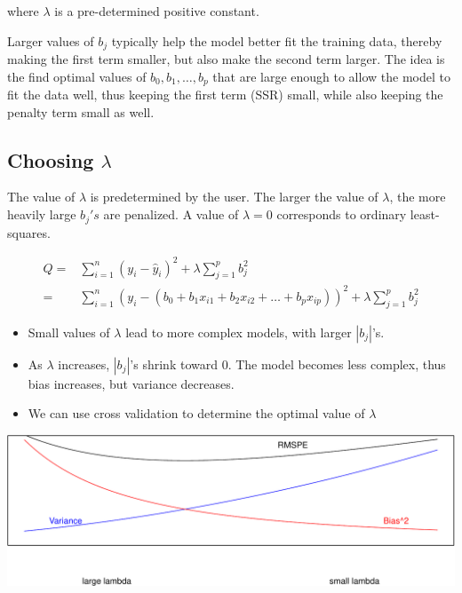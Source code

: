 \documentclass[
  letterpaper,
  DIV=11,
  numbers=noendperiod]{scrreprt}
\providecommand{\tightlist}{%
  \setlength{\itemsep}{0pt}\setlength{\parskip}{0pt}}\usepackage{longtable,booktabs,array}
\begin{document}
where \(\lambda\) is a pre-determined positive constant.

Larger values of \(b_j\) typically help the model better fit the
training data, thereby making the first term smaller, but also make the
second term larger. The idea is the find optimal values of
\(b_0, b_1, \ldots, b_p\) that are large enough to allow the model to
fit the data well, thus keeping the first term (SSR) small, while also
keeping the penalty term small as well.

\subsection{\texorpdfstring{Choosing
\(\lambda\)}{Choosing \textbackslash lambda}}\label{choosing-lambda}

The value of \(\lambda\) is predetermined by the user. The larger the
value of \(\lambda\), the more heavily large \(b_j's\) are penalized. A
value of \(\lambda=0\) corresponds to ordinary least-squares.

\[
\begin{aligned}
Q=& \displaystyle\sum_{i=1}^n (y_i -\hat{y}_i)^2  + \lambda\displaystyle\sum_{j=1}^pb_j^2\\ =  & \displaystyle\sum_{i=1}^n (y_i -(b_0 + b_1x_{i1} + b_2x_{i2} + \ldots + b_px_{ip}))^2 + \lambda\displaystyle\sum_{j=1}^pb_j^2
\end{aligned}
\]

\begin{itemize}
\tightlist
\item
  Small values of \(\lambda\) lead to more complex models, with larger
  \(|b_j|\)'s.\\
\item
  As \(\lambda\) increases, \(|b_j|\)'s shrink toward 0. The model
  becomes less complex, thus bias increases, but variance decreases.\\
\item
  We can use cross validation to determine the optimal value of
  \(\lambda\)
\end{itemize}

\includegraphics{Ch7_files/figure-pdf/unnamed-chunk-37-1.pdf}
\end{document}
